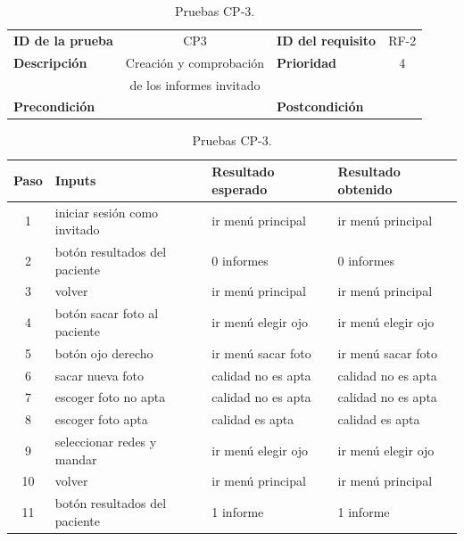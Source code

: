 \begin{table}[htbp]
    \centering
    \begin{tabular}{|lc|lc|}
    \toprule
         \textbf{ID de la prueba} & CP3 & \textbf{ID del requisito} & RF-2\\
        \textbf{Descripción} &  Creación y comprobación  & \textbf{Prioridad} & 4\\
            & de los informes invitado & & \\
        \textbf{Precondición} &   & \textbf{Postcondición} &   \\
        \bottomrule
    \end{tabular}
    \centering
    \begin{tabular}{clll}
    \toprule
    Paso & Inputs & Resultado esperado & Resultado obtenido  \\
    \midrule
    
    1 & iniciar sesión como invitado & ir menú principal & ir menú principal  \\
    2 & botón resultados del paciente & 0 informes & 0 informes  \\
    3 & volver & ir menú principal & ir menú principal  \\
    4 & botón sacar foto al paciente & ir menú elegir ojo & ir menú elegir ojo \\
    5 & botón ojo derecho & ir menú sacar foto & ir menú sacar foto  \\
    6  & sacar nueva foto & calidad no es apta & calidad no es apta  \\
    7  & escoger foto no apta & calidad no es apta & calidad no es apta  \\
    8  & escoger foto apta & calidad es apta & calidad es apta  \\
    9  & seleccionar redes y mandar & ir menú elegir ojo & ir menú elegir ojo  \\
    10  & volver & ir menú principal & ir menú principal  \\
    11  & botón resultados del paciente & 1 informe & 1 informe  \\
    
    
    \bottomrule
    \end{tabular}
\caption{Pruebas CP-3.}
\label{Pruebas CP-3}
\end{table}

